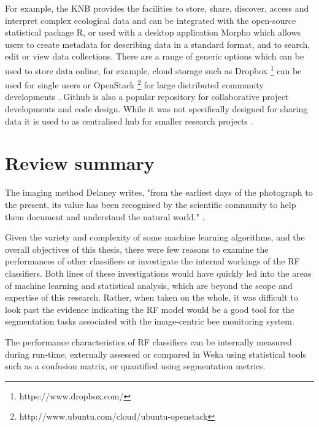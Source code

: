For example, the \ac{KNB} provides the facilities to store, share, discover, access and interpret complex ecological data and can be integrated with the open-source statistical package R, or used with a desktop application Morpho which allows users to create metadata for describing data in a standard format, and to search, edit or view data collections. There are a range of generic options which can be used to store data online, for example, cloud storage such as Dropbox \footnote{https://www.dropbox.com/} can be used for single users or OpenStack \footnote{http://www.ubuntu.com/cloud/ubuntu-openstack} for large distributed community developments \cite{Platforms2012}. Github is also a popular repository for collaborative project developments and code design. While it was not specifically designed for sharing data it is used to as centralised hub for smaller research projects \cite{Easlon2014, Altermatt2014}.

\section{Review summary}\label{sec:ch3-review-summary}
\begin{remark}{The imaging method}
Delaney \cite{Delaney2008} writes, "from the earliest days of the photograph to the present, its value has been recognised by the scientific community to help them document and understand the natural world." \cite[pg.76]{Delaney2008}.
\end{remark}

Given the variety and complexity of some machine learning algorithms, and the overall objectives of this thesis, there were few reasons to examine the performances of other classifiers or investigate the internal workings of the \ac{RF} classifiers. Both lines of these investigations would have quickly led into the areas of machine learning and statistical analysis, which are beyond the scope and expertise of this research. Rather, when taken on the whole, it was difficult to look past the evidence indicating the \ac{RF} model would be a good tool for the segmentation tasks associated with the image-centric bee monitoring system.

The performance characteristics of \ac{RF} classifiers can be internally measured during run-time, externally assessed or compared in Weka using statistical tools such as a confusion matrix, or quantified using segmentation metrics.
